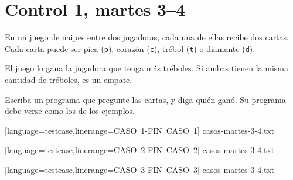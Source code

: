 \documentclass[12pt,spanish,a5paper,landscape]{article}
\begin{document}
  \newpage
  \part*{Control 1, martes 3--4}
  \newpage

  En un juego de naipes entre dos jugadoras,
  cada una de ellas recibe dos cartas.
  Cada carta puede ser
  pica (\verb+p+),
  corazón (\verb+c+),
  trébol (\verb+t+) o
  diamante (\verb+d+).

  El juego lo gana la jugadora que tenga más tréboles.
  Si ambas tienen la misma cantidad de tréboles,
  es un empate.

  Escriba un programa que pregunte las cartas,
  y diga quién ganó.
  Su programa debe verse como los de los ejemplos.

  \begin{minipage}{0.25\textwidth}
      [language=testcase,linerange=CASO\ 1-FIN\ CASO\ 1]%
      {casos-martes-3-4.txt}
  \end{minipage}
  \hspace{1em}
  \begin{minipage}{0.25\textwidth}
      [language=testcase,linerange=CASO\ 2-FIN\ CASO\ 2]%
      {casos-martes-3-4.txt}
  \end{minipage}
  \hspace{1em}
  \begin{minipage}{0.25\textwidth}
      [language=testcase,linerange=CASO\ 3-FIN\ CASO\ 3]%
      {casos-martes-3-4.txt}
  \end{minipage}
\end{document}
